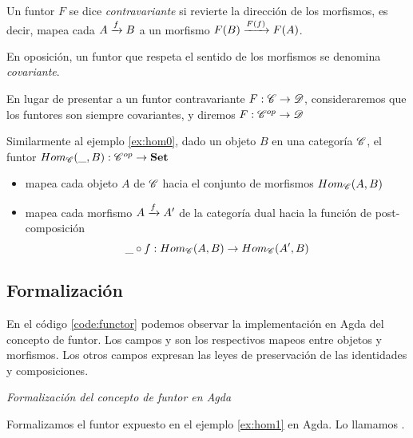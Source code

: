 \begin{definition}
  Un funtor $F$ se dice {\it contravariante} si revierte la dirección de los morfismos, es decir, mapea cada $ A\xrightarrow{f}B$ a un morfismo $ F(B)\xrightarrow{F(f)}F(A)$.

  En oposición, un funtor que respeta el sentido de los morfismos se denomina {\it covariante}.

  En lugar de presentar a un funtor contravariante $F : \mathscr{C} \to \mathscr{D}$, consideraremos que los funtores son siempre covariantes, y diremos $F : \mathscr{C}^{op} \to \mathscr{D}$
  
\end{definition}


\begin{example} \label{ex:hom1}
  Similarmente al ejemplo \ref{ex:hom0}, dado un objeto $B$ en una categoría $\mathscr{C}$, el funtor $Hom_{\mathscr{C}}(\_,B) : \mathscr{C}^{op} \to \mathbf{Set}$

  \begin{itemize}
  \item mapea cada objeto $A$ de $\mathscr{C}$ hacia el conjunto de morfismos $Hom_{\mathscr{C}}(A,B)$
  \item mapea cada morfismo $ A\xrightarrow{f}A'$ de la categoría dual hacia la función de post-composición $$\_ \circ f : Hom_{\mathscr{C}}(A,B) \to Hom_{\mathscr{C}}(A',B)$$
  \end{itemize}
\end{example}

\subsection{Formalización} En el código \ref{code:functor} podemos observar la implementación en Agda del concepto de funtor. Los campos  y  son los respectivos mapeos entre objetos y morfismos. Los otros campos expresan las leyes de preservación de las identidades y composiciones.

\begin{agdacode}{\it Formalización del concepto de funtor en Agda} \label{code:functor}

\end{agdacode}


\begin{agdacode}\label{code:hom1}Formalizamos el funtor expuesto en el ejemplo \ref{ex:hom1} en Agda. Lo llamamos .

\end{agdacode}

